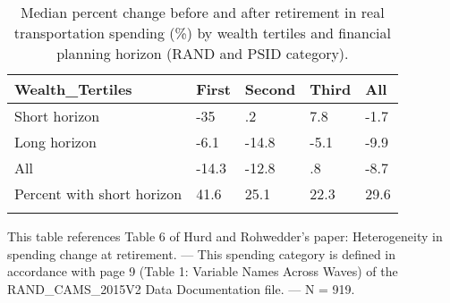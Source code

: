 \begin{table}[tbp] \centering
{}

\caption{Median percent change before and after retirement in real transportation spending (\%) by wealth tertiles and financial planning horizon (RAND and PSID category).}
\begin{tabularx}{\textwidth}{lCCCC}

\toprule
{Wealth\_Tertiles}&{First}&{Second}&{Third}&{All} \tabularnewline
\midrule\addlinespace[1.5ex]
Short horizon&-35&.2&7.8&-1.7 \tabularnewline
Long horizon&-6.1&-14.8&-5.1&-9.9 \tabularnewline
All&-14.3&-12.8&.8&-8.7 \tabularnewline
Percent with short horizon&41.6&25.1&22.3&29.6 \tabularnewline
\bottomrule \addlinespace[1.5ex]

\end{tabularx}
\begin{flushleft}
\footnotesize This table references Table 6 of Hurd and Rohwedder's paper: Heterogeneity in spending change at retirement. \linebreak --- \linebreak This spending category is defined in accordance with page 9 (Table 1: Variable Names Across Waves) of the RAND\_CAMS\_2015V2 Data Documentation file. \linebreak --- \linebreak N = 919.
\end{flushleft}
\end{table}
